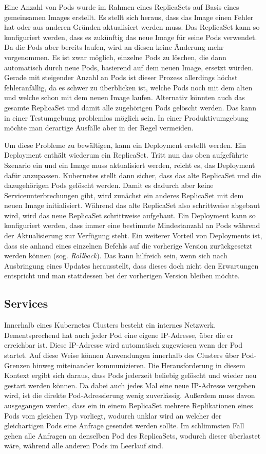\documentclass[11pt,a4paper]{article}
\begin{document}
Eine Anzahl von Pods wurde im Rahmen eines ReplicaSets auf Basis eines gemeinsamen Images erstellt.
Es stellt sich heraus, dass das Image einen Fehler hat oder aus anderen Gründen aktualisiert werden muss.
Das ReplicaSet kann so konfiguriert werden, dass es zukünftig das neue Image für seine Pods verwendet.
Da die Pods aber bereits laufen, wird an diesen keine Änderung mehr vorgenommen. Es ist zwar möglich,
einzelne Pods zu löschen, die dann automatisch durch neue Pods, basierend auf dem neuen Image, ersetzt würden.
Gerade mit steigender Anzahl an Pods ist dieser Prozess allerdings höchst 
fehleranfällig, da es schwer zu überblicken ist, welche Pods noch mit dem alten und welche schon mit dem
neuen Image laufen. Alternativ könnten auch das gesamte ReplicaSet und damit alle zugehörigen Pods gelöscht werden.
Das kann in einer Testumgebung problemlos möglich sein. In einer Produktivumgebung möchte man derartige
Ausfälle aber in der Regel vermeiden.

Um diese Probleme zu bewältigen, kann ein Deployment erstellt werden.
Ein Deployment enthält wiederum ein ReplicaSet. Tritt nun das oben aufgeführte Szenario ein und ein Image
muss aktualisiert werden, reicht es, das Deployment dafür anzupassen.
Kubernetes stellt dann sicher, dass das alte ReplicaSet und die dazugehörigen Pods gelöscht werden.
Damit es dadurch aber keine Serviceunterbrechungen gibt, wird zunächst ein anderes ReplicaSet mit dem neuen
Image initialisiert. Während das alte ReplicaSet also schrittweise abgebaut wird, wird das neue ReplicaSet
schrittweise aufgebaut. Ein Deployment kann so konfiguriert werden, dass immer eine bestimmte Mindestanzahl an
Pods während der Aktualisierung zur Verfügung steht.
Ein weiterer Vorteil von Deployments ist, dass sie anhand eines einzelnen Befehls auf die vorherige Version
zurückgesetzt werden können (sog. \emph{Rollback}). Das kann hilfreich sein, wenn sich nach Ausbringung eines
Updates herausstellt, dass dieses doch nicht den Erwartungen entspricht und man stattdessen bei der vorherigen
Version bleiben möchte.

\subsection{Services}
Innerhalb eines Kubernetes Clusters besteht ein internes Netzwerk. Dementsprechend hat auch jeder Pod
eine eigene IP-Adresse, über die er erreichbar ist. Diese IP-Adresse wird automatisch zugewiesen wenn der Pod startet.
Auf diese Weise können Anwendungen innerhalb des Clusters über Pod-Grenzen hinweg miteinander kommunizieren.
Die Herausforderung in diesem Kontext ergibt sich daraus, dass Pods jederzeit beliebig gelöscht
und wieder neu gestart werden können. Da dabei auch jedes Mal eine neue IP-Adresse vergeben wird,
ist die direkte Pod-Adressierung wenig zuverlässig. Außerdem muss davon ausgegangen werden, dass
ein in einem ReplicaSet mehrere Replikationen eines Pods vom gleichen Typ vorliegt, wodurch unklar wird
an welcher der gleichartigen Pods eine Anfrage gesendet werden sollte. Im schlimmsten Fall gehen alle Anfragen
an denselben Pod des ReplicaSets, wodurch dieser überlastet wäre, während alle anderen Pods im Leerlauf sind.
\end{document}
